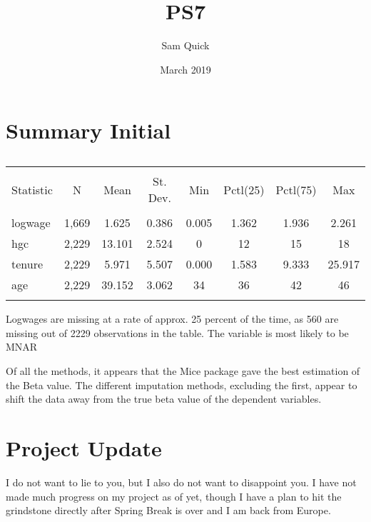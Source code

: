 \documentclass{article}
\title{PS7}
\author{Sam Quick}
\date{March 2019}
\begin{document}
\maketitle

\section{Summary Initial}
\begin{table}[!htbp] \centering 
  \caption{} 
  \label{} 
\begin{tabular}{@{\extracolsep{5pt}}lccccccc} 
\\[-1.8ex]\hline 
\hline \\[-1.8ex] 
Statistic & \multicolumn{1}{c}{N} & \multicolumn{1}{c}{Mean} & \multicolumn{1}{c}{St. Dev.} & \multicolumn{1}{c}{Min} & \multicolumn{1}{c}{Pctl(25)} & \multicolumn{1}{c}{Pctl(75)} & \multicolumn{1}{c}{Max} \\ 
\hline \\[-1.8ex] 
logwage & 1,669 & 1.625 & 0.386 & 0.005 & 1.362 & 1.936 & 2.261 \\ 
hgc & 2,229 & 13.101 & 2.524 & 0 & 12 & 15 & 18 \\ 
tenure & 2,229 & 5.971 & 5.507 & 0.000 & 1.583 & 9.333 & 25.917 \\ 
age & 2,229 & 39.152 & 3.062 & 34 & 36 & 42 & 46 \\ 
\hline \\[-1.8ex] 
\end{tabular} 
\end{table} 


Logwages are missing at a rate of approx. 25 percent of the time, as 560 are missing out of 2229 observations in the table. 
The variable is most likely to be MNAR

Of all the methods, it appears that the Mice package gave the best estimation of the Beta value. The different imputation methods, excluding the first, appear to shift the data away from the true beta value of the dependent variables. 

\section{Project Update}

I do not want to lie to you, but I also do not want to disappoint you. I have not made much progress on my project as of yet, though I have a plan to hit the grindstone directly after Spring Break is over and I am back from Europe.
\end{document}
